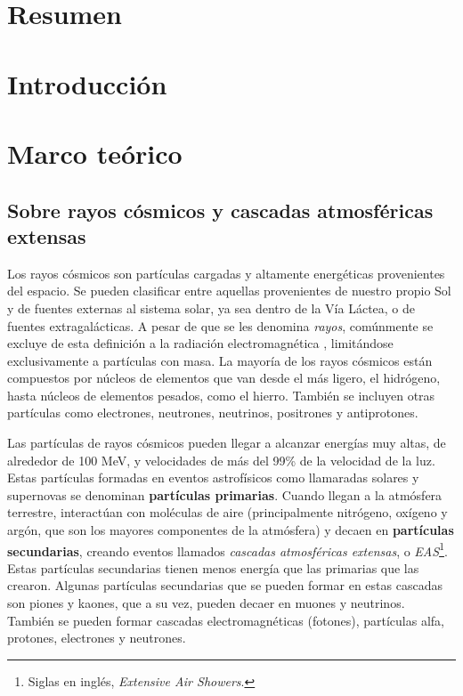 \documentclass[12pt]{report}
\begin{document}

\section*{Resumen}


\section*{Introducción}








\section*{Marco teórico}

\subsection*{Sobre rayos cósmicos y cascadas atmosféricas extensas}

\normalsize

Los rayos cósmicos son partículas cargadas y altamente energéticas provenientes del espacio. Se pueden clasificar entre aquellas provenientes de nuestro propio Sol y de fuentes externas al sistema solar, ya sea dentro de la Vía Láctea, o de fuentes extragalácticas. \cite{moldwin2008introduction} A pesar de que se les denomina \textit{rayos}, comúnmente se excluye de esta definición a la radiación electromagnética \cite{NASACosmicopia}, limitándose exclusivamente a partículas con masa. La mayoría de los rayos cósmicos están compuestos por núcleos de elementos que van desde el más ligero, el hidrógeno, hasta núcleos de elementos pesados, como el hierro. También se incluyen otras partículas como electrones, neutrones, neutrinos, positrones y antiprotones. \cite{NASAImagine}

Las partículas de rayos cósmicos pueden llegar a alcanzar energías muy altas, de alrededor de 100 MeV, y velocidades de más del 99\% de la velocidad de la luz. \cite{moldwin2008introduction} Estas partículas formadas en eventos astrofísicos como llamaradas solares y supernovas se denominan \textbf{partículas primarias}. Cuando llegan a la atmósfera terrestre, interactúan con moléculas de aire (principalmente nitrógeno, oxígeno y argón, que son los mayores componentes de la atmósfera) y decaen en \textbf{partículas secundarias}, creando eventos llamados \textit{cascadas atmosféricas extensas}, o \textit{EAS}\footnote{Siglas en inglés, \textit{Extensive Air Showers}.}. Estas partículas secundarias tienen menos energía que las primarias que las crearon. Algunas partículas secundarias que se pueden formar en estas cascadas son piones y kaones, que a su vez, pueden decaer en muones y neutrinos. \cite{grieder2010extensive} También se pueden formar cascadas electromagnéticas (fotones), partículas alfa, protones, electrones y neutrones.
\end{document}

